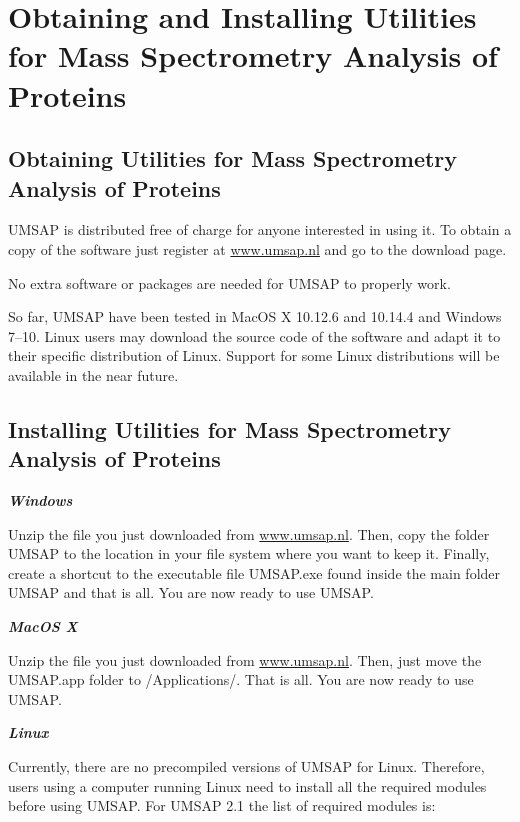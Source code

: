 \chapter{Obtaining and Installing Utilities for Mass Spectrometry Analysis of Proteins}

\section{Obtaining Utilities for Mass Spectrometry Analysis of Proteins}

UMSAP is distributed free of charge for anyone interested in using it. To obtain a copy of the software just register at \href{https://www.umsap.nl}{www.umsap.nl} and go to the download page.

No extra software or packages are needed for UMSAP to properly work.

So far, UMSAP have been tested in MacOS X \num[parse-numbers=false]{10.12.6} and \num[parse-numbers=false]{10.14.4} and Windows \numrange[range-phrase = /]{7}{10}. Linux users may download the source code of the software and adapt it to their specific distribution of Linux. Support for some Linux distributions will be available in the near future. 

\section{Installing Utilities for Mass Spectrometry Analysis of Proteins}

\textit{\textbf{Windows}}

Unzip the file you just downloaded from \href{https://www.umsap.nl}{www.umsap.nl}. Then, copy the folder UMSAP to the location in your file system where you want to keep it. Finally, create a shortcut to the executable file UMSAP.exe found inside the main folder UMSAP and that is all. You are now ready to use UMSAP.

\textit{\textbf{MacOS X}}

Unzip the file you just downloaded from \href{https://www.umsap.nl}{www.umsap.nl}. Then, just move the UMSAP.app folder to /Applications/. That is all. You are now ready to use UMSAP.

\newpage

\textit{\textbf{Linux}}

Currently, there are no precompiled versions of UMSAP for Linux. Therefore, users using a computer running Linux need to install all the required modules before using UMSAP. For UMSAP 2.1 the list of required modules is:

